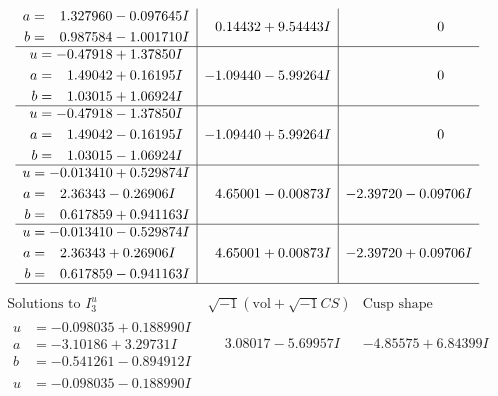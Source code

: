 \documentclass[1p]{elsarticle_modified}
\theoremstyle{definition}
\newcommand{\I}{\sqrt{-1}}
\begin{document}
$$\begin{array}{c|c|c}
\begin{aligned}
a &= \phantom{-}1.327960 - 0.097645 I \\
b &= \phantom{-}0.987584 - 1.001710 I\end{aligned}
 & \phantom{-}0.14432 + 9.54443 I & \phantom{-0.000000 } 0 \\ \hline\begin{aligned}
u &= -0.47918 + 1.37850 I \\
a &= \phantom{-}1.49042 + 0.16195 I \\
b &= \phantom{-}1.03015 + 1.06924 I\end{aligned}
 & -1.09440 - 5.99264 I & \phantom{-0.000000 } 0 \\ \hline\begin{aligned}
u &= -0.47918 - 1.37850 I \\
a &= \phantom{-}1.49042 - 0.16195 I \\
b &= \phantom{-}1.03015 - 1.06924 I\end{aligned}
 & -1.09440 + 5.99264 I & \phantom{-0.000000 } 0 \\ \hline\begin{aligned}
u &= -0.013410 + 0.529874 I \\
a &= \phantom{-}2.36343 - 0.26906 I \\
b &= \phantom{-}0.617859 + 0.941163 I\end{aligned}
 & \phantom{-}4.65001 - 0.00873 I & -2.39720 - 0.09706 I \\ \hline\begin{aligned}
u &= -0.013410 - 0.529874 I \\
a &= \phantom{-}2.36343 + 0.26906 I \\
b &= \phantom{-}0.617859 - 0.941163 I\end{aligned}
 & \phantom{-}4.65001 + 0.00873 I & -2.39720 + 0.09706 I\\
 \hline 
 \end{array}$$\newpage$$\begin{array}{c|c|c}  
\text{Solutions to }I^u_{3}& \I (\text{vol} + \sqrt{-1}CS) & \text{Cusp shape}\\
 \hline 
\begin{aligned}
u &= -0.098035 + 0.188990 I \\
a &= -3.10186 + 3.29731 I \\
b &= -0.541261 - 0.894912 I\end{aligned}
 & \phantom{-}3.08017 - 5.69957 I & -4.85575 + 6.84399 I \\ \hline\begin{aligned}
u &= -0.098035 - 0.188990 I \\

\end{aligned}
\end{array}$$
\end{document}
